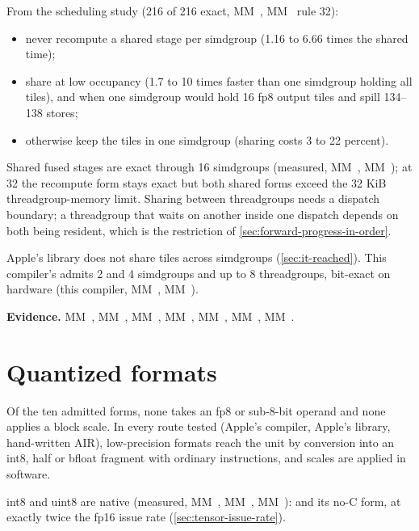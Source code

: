 From the scheduling study (216 of 216 exact, MM~, MM~ rule 32):

\begin{itemize}
\item never recompute a shared stage per simdgroup (1.16 to 6.66 times the shared time);
\item share at low occupancy (1.7 to 10 times faster than one simdgroup holding all tiles), and when one simdgroup would
  hold 16 fp8 output tiles and spill 134–138 stores;
\item otherwise keep the tiles in one simdgroup (sharing costs 3 to 22 percent).
\end{itemize}

Shared fused stages are exact through 16 simdgroups (measured, MM~, MM~); at 32 the recompute form
stays exact but both shared forms exceed the 32 KiB threadgroup-memory limit. Sharing between threadgroups needs a
dispatch boundary; a threadgroup that waits on another inside one dispatch depends on both being resident, which is
the restriction of \cref{sec:forward-progress-in-order}.

Apple's library does not share tiles across simdgroups (\cref{sec:it-reached}). This
compiler's  admits 2 and 4 simdgroups and up to 8 threadgroups, bit-exact on hardware (this compiler,
MM~, MM~).

\textbf{Evidence.} MM~, MM~, MM~, MM~, MM~, MM~, MM~.

\section{Quantized formats}\label{sec:quantized-formats}

Of the ten admitted forms, none takes an fp8 or sub-8-bit operand and none applies a block scale. In every route
tested (Apple's compiler, Apple's library, hand-written AIR), low-precision formats reach the unit by conversion into
an int8, half or bfloat fragment with ordinary instructions, and scales are applied in software.

int8 and uint8 are native (measured, MM~, MM~, MM~):  and its
no-C form, at exactly twice the fp16 issue rate (\cref{sec:tensor-issue-rate}).

